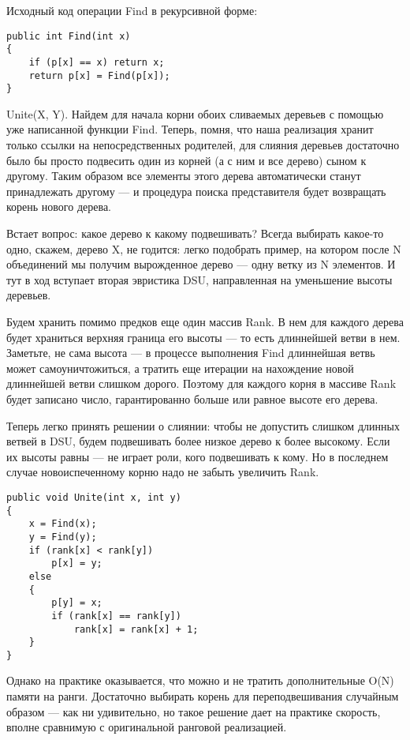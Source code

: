 \documentclass[14pt, twoside]{extreport}
\begin{document}
Исходный код операции Find в рекурсивной форме:

\begin{lstlisting}
public int Find(int x)
{
    if (p[x] == x) return x;
    return p[x] = Find(p[x]);
}
\end{lstlisting}

Unite(X, Y). Найдем для начала корни обоих сливаемых деревьев с помощью уже написанной функции Find. Теперь, помня, что наша реализация хранит только ссылки на непосредственных родителей, для слияния деревьев достаточно было бы просто подвесить один из корней (а с ним и все дерево) сыном к другому. Таким образом все элементы этого дерева автоматически станут принадлежать другому — и процедура поиска представителя будет возвращать корень нового дерева.

Встает вопрос: какое дерево к какому подвешивать? Всегда выбирать какое-то одно, скажем, дерево X, не годится: легко подобрать пример, на котором после N объединений мы получим вырожденное дерево — одну ветку из N элементов. И тут в ход вступает вторая эвристика DSU, направленная на уменьшение высоты деревьев.

Будем хранить помимо предков еще один массив Rank. В нем для каждого дерева будет храниться верхняя граница его высоты — то есть длиннейшей ветви в нем. Заметьте, не сама высота — в процессе выполнения Find длиннейшая ветвь может самоуничтожиться, а тратить еще итерации на нахождение новой длиннейшей ветви слишком дорого. Поэтому для каждого корня в массиве Rank будет записано число, гарантированно больше или равное высоте его дерева.

Теперь легко принять решении о слиянии: чтобы не допустить слишком длинных ветвей в DSU, будем подвешивать более низкое дерево к более высокому. Если их высоты равны — не играет роли, кого подвешивать к кому. Но в последнем случае новоиспеченному корню надо не забыть увеличить Rank.

\begin{lstlisting}
public void Unite(int x, int y)
{
    x = Find(x);
    y = Find(y);
    if (rank[x] < rank[y])
        p[x] = y;
    else
    {
        p[y] = x;
        if (rank[x] == rank[y])
            rank[x] = rank[x] + 1;
    }
}
\end{lstlisting}

Однако на практике оказывается, что можно и не тратить дополнительные O(N) памяти на ранги. Достаточно выбирать корень для переподвешивания случайным образом --- как ни удивительно, но такое решение дает на практике скорость, вполне сравнимую с оригинальной ранговой реализацией.
\end{document}
